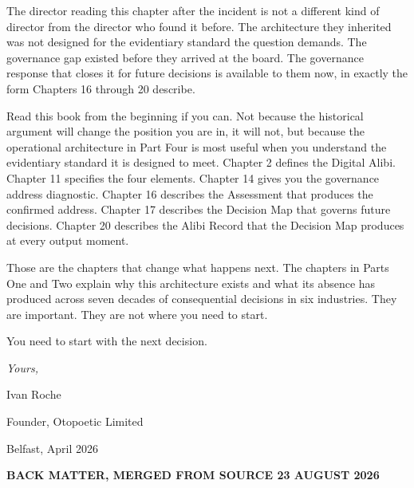 The director reading this chapter after the incident is not a different kind of director from the director who found it before. The architecture they inherited was not designed for the evidentiary standard the question demands. The governance gap existed before they arrived at the board. The governance response that closes it for future decisions is available to them now, in exactly the form Chapters 16 through 20 describe.

Read this book from the beginning if you can. Not because the historical argument will change the position you are in, it will not, but because the operational architecture in Part Four is most useful when you understand the evidentiary standard it is designed to meet. Chapter 2 defines the Digital Alibi. Chapter 11 specifies the four elements. Chapter 14 gives you the governance address diagnostic. Chapter 16 describes the Assessment that produces the confirmed address. Chapter 17 describes the Decision Map that governs future decisions. Chapter 20 describes the Alibi Record that the Decision Map produces at every output moment.

Those are the chapters that change what happens next. The chapters in Parts One and Two explain why this architecture exists and what its absence has produced across seven decades of consequential decisions in six industries. They are important. They are not where you need to start.

You need to start with the next decision.

\emph{Yours,}

Ivan Roche

Founder, Otopoetic Limited

Belfast, April 2026

\textbf{BACK MATTER, MERGED FROM SOURCE 23 AUGUST 2026}
